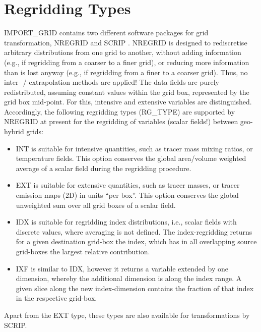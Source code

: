 \documentclass[11pt,twoside]{report}
\begin{document}
\section{Regridding Types \label{IGTYPE}}
IMPORT\_GRID contains two different software packages for grid
transformation, NREGRID \citep{Joeckel06a} and 
SCRIP \citep{Jones99}. NREGRID is designed to 
rediscretise arbitrary distributions from one grid to another, without adding
 information (e.g., if regridding from a coarser to a finer grid), or reducing 
more information than is lost anyway (e.g., if regridding from a finer to a coarser grid). Thus, no inter- /
extrapolation methods are applied! The data fields are purely redistributed,
assuming constant values within the grid box, represented by the grid box mid-point. 
For this, intensive and extensive variables are distinguished.
Accordingly, the following regridding types (RG\_TYPE) are supported by NREGRID at present
for the regridding of variables (scalar fields!) between geo-hybrid grids:
\begin{itemize}
\item INT is suitable for intensive quantities, such as tracer mass mixing ratios, or
temperature fields. This option conserves the global area/volume
weighted average of a scalar field during the regridding procedure.
\item EXT is suitable for extensive quantities, such as tracer masses, or 
tracer emission maps (2D) in units ``per box''. 
This option conserves the global unweighted sum over all grid
boxes of a scalar field.
\item IDX is suitable for regridding index distributions, i.e., scalar fields with discrete
values, where averaging is not defined. The index-regridding returns for a given
destination grid-box the index, which has in all overlapping source grid-boxes
the largest relative contribution.
\item IXF is similar to IDX, however it returns a variable extended by
one dimension, 
whereby the additional dimension is along the index range. A given slice along
the new index-dimension contains the fraction of that index in the respective
grid-box.
\end{itemize}

Apart from the EXT type, these types are also  available for
transformations by SCRIP.

\end{document}
